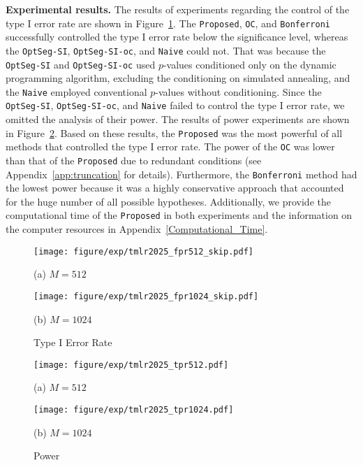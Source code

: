 \textbf{Experimental results.}
The results of experiments regarding the control of the type I error rate are shown in Figure~\ref{fig_fpr}.
The \texttt{Proposed}, \texttt{OC}, and \texttt{Bonferroni} successfully controlled the type I error rate below the significance level, 
whereas the \texttt{OptSeg-SI}, \texttt{OptSeg-SI-oc}, and \texttt{Naive} could not. 
That was because the \texttt{OptSeg-SI} and \texttt{OptSeg-SI-oc} 
used $p$-values conditioned only on the dynamic programming algorithm, 
excluding the conditioning on simulated annealing,
and the \texttt{Naive} employed conventional $p$-values without conditioning. 
Since the \texttt{OptSeg-SI}, \texttt{OptSeg-SI-oc}, and \texttt{Naive} failed to control the type I error rate, 
we omitted the analysis of their power.
The results of power experiments are shown in Figure~\ref{fig_tpr}. 
Based on these results, the \texttt{Proposed} was the most powerful of all methods that controlled the type I error rate.
The power of the \texttt{OC} was lower than that of the \texttt{Proposed} due to redundant conditions (see Appendix~\ref{app:truncation} for details). %
Furthermore, the \texttt{Bonferroni} method had the lowest power because it was a highly conservative approach that accounted for the huge number of all possible hypotheses.
Additionally, we provide the computational time of the \texttt{Proposed} in both experiments and the information on the computer resources in Appendix~\ref{Computational_Time}.

\begin{figure}[H]
  \centering
  \begin{minipage}[t]{0.45\hsize}
      \centering
      \texttt{[image: figure/exp/tmlr2025\_fpr512\_skip.pdf]}
      \caption*{(a) $M=512$}
  \end{minipage}
  \hfill
  \begin{minipage}[t]{0.45\hsize}
      \centering
      \texttt{[image: figure/exp/tmlr2025\_fpr1024\_skip.pdf]}
      \caption*{(b) $M=1024$}
  \end{minipage}
  \caption{Type I Error Rate}
  \label{fig_fpr}
\end{figure}
\begin{figure}[H]
  \centering
  \begin{minipage}[t]{0.45\hsize}
      \centering
      \texttt{[image: figure/exp/tmlr2025\_tpr512.pdf]}
      \caption*{(a) $M=512$}
  \end{minipage}
  \hfill
  \begin{minipage}[t]{0.45\hsize}
      \centering
      \texttt{[image: figure/exp/tmlr2025\_tpr1024.pdf]}
      \caption*{(b) $M=1024$}
  \end{minipage}
  \caption{Power}
  \label{fig_tpr}
\end{figure}

